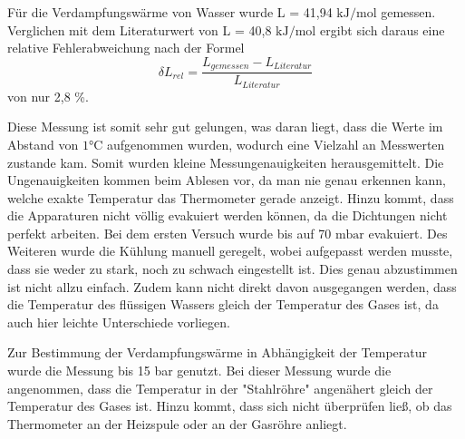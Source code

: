 Für die Verdampfungswärme von Wasser wurde L = 41,94 $\si{\kilo \joule \per \mol}$
gemessen. Verglichen mit dem Literaturwert von L = 40,8 $\si{\kilo \joule \per \mol}$
\cite{chemie} ergibt sich daraus eine relative Fehlerabweichung nach der Formel
\begin{equation}
  \delta L_{rel} = \frac{L_{gemessen}-L_{Literatur}}{L_{Literatur}}
\end{equation}
von nur 2,8 \%.

Diese Messung ist somit sehr gut gelungen, was daran liegt, dass die
Werte im Abstand von $1 \si{\celsius}$ aufgenommen wurden, wodurch eine Vielzahl
an Messwerten zustande kam. Somit wurden kleine Messungenauigkeiten herausgemittelt.
Die Ungenauigkeiten kommen beim Ablesen vor, da man nie genau erkennen kann, welche
exakte Temperatur das Thermometer gerade anzeigt. Hinzu kommt, dass die Apparaturen
nicht völlig evakuiert werden können, da die Dichtungen nicht perfekt arbeiten. Bei
dem ersten Versuch wurde bis auf 70 $\si{\milli \bar}$ evakuiert. Des Weiteren
wurde die Kühlung manuell geregelt, wobei aufgepasst werden musste, dass sie weder
zu stark, noch zu schwach eingestellt ist. Dies genau abzustimmen ist nicht
allzu einfach. Zudem kann nicht direkt davon ausgegangen werden, dass die Temperatur
des flüssigen Wassers gleich der Temperatur des Gases ist, da auch hier leichte
Unterschiede vorliegen.

Zur Bestimmung der Verdampfungswärme in Abhängigkeit der Temperatur wurde die Messung
bis 15 bar genutzt. Bei dieser Messung wurde die angenommen, dass die Temperatur in
der "Stahlröhre" angenähert gleich der Temperatur des Gases ist. Hinzu kommt, dass
sich nicht überprüfen ließ, ob das Thermometer an der Heizspule oder an der Gasröhre
anliegt.
